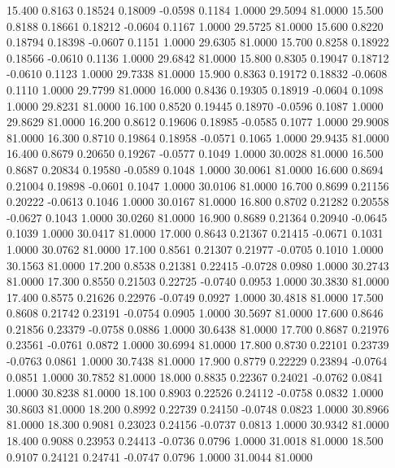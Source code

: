   15.400   0.8163   0.18524   0.18009  -0.0598   0.1184   1.0000  29.5094  81.0000
  15.500   0.8188   0.18661   0.18212  -0.0604   0.1167   1.0000  29.5725  81.0000
  15.600   0.8220   0.18794   0.18398  -0.0607   0.1151   1.0000  29.6305  81.0000
  15.700   0.8258   0.18922   0.18566  -0.0610   0.1136   1.0000  29.6842  81.0000
  15.800   0.8305   0.19047   0.18712  -0.0610   0.1123   1.0000  29.7338  81.0000
  15.900   0.8363   0.19172   0.18832  -0.0608   0.1110   1.0000  29.7799  81.0000
  16.000   0.8436   0.19305   0.18919  -0.0604   0.1098   1.0000  29.8231  81.0000
  16.100   0.8520   0.19445   0.18970  -0.0596   0.1087   1.0000  29.8629  81.0000
  16.200   0.8612   0.19606   0.18985  -0.0585   0.1077   1.0000  29.9008  81.0000
  16.300   0.8710   0.19864   0.18958  -0.0571   0.1065   1.0000  29.9435  81.0000
  16.400   0.8679   0.20650   0.19267  -0.0577   0.1049   1.0000  30.0028  81.0000
  16.500   0.8687   0.20834   0.19580  -0.0589   0.1048   1.0000  30.0061  81.0000
  16.600   0.8694   0.21004   0.19898  -0.0601   0.1047   1.0000  30.0106  81.0000
  16.700   0.8699   0.21156   0.20222  -0.0613   0.1046   1.0000  30.0167  81.0000
  16.800   0.8702   0.21282   0.20558  -0.0627   0.1043   1.0000  30.0260  81.0000
  16.900   0.8689   0.21364   0.20940  -0.0645   0.1039   1.0000  30.0417  81.0000
  17.000   0.8643   0.21367   0.21415  -0.0671   0.1031   1.0000  30.0762  81.0000
  17.100   0.8561   0.21307   0.21977  -0.0705   0.1010   1.0000  30.1563  81.0000
  17.200   0.8538   0.21381   0.22415  -0.0728   0.0980   1.0000  30.2743  81.0000
  17.300   0.8550   0.21503   0.22725  -0.0740   0.0953   1.0000  30.3830  81.0000
  17.400   0.8575   0.21626   0.22976  -0.0749   0.0927   1.0000  30.4818  81.0000
  17.500   0.8608   0.21742   0.23191  -0.0754   0.0905   1.0000  30.5697  81.0000
  17.600   0.8646   0.21856   0.23379  -0.0758   0.0886   1.0000  30.6438  81.0000
  17.700   0.8687   0.21976   0.23561  -0.0761   0.0872   1.0000  30.6994  81.0000
  17.800   0.8730   0.22101   0.23739  -0.0763   0.0861   1.0000  30.7438  81.0000
  17.900   0.8779   0.22229   0.23894  -0.0764   0.0851   1.0000  30.7852  81.0000
  18.000   0.8835   0.22367   0.24021  -0.0762   0.0841   1.0000  30.8238  81.0000
  18.100   0.8903   0.22526   0.24112  -0.0758   0.0832   1.0000  30.8603  81.0000
  18.200   0.8992   0.22739   0.24150  -0.0748   0.0823   1.0000  30.8966  81.0000
  18.300   0.9081   0.23023   0.24156  -0.0737   0.0813   1.0000  30.9342  81.0000
  18.400   0.9088   0.23953   0.24413  -0.0736   0.0796   1.0000  31.0018  81.0000
  18.500   0.9107   0.24121   0.24741  -0.0747   0.0796   1.0000  31.0044  81.0000
